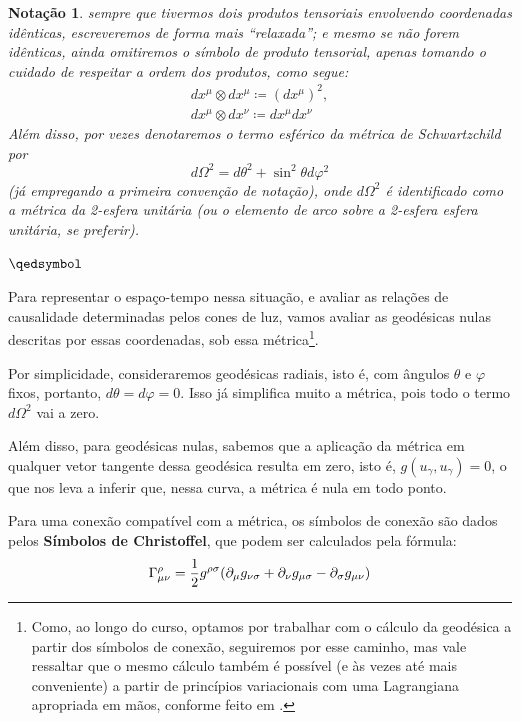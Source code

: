 \documentclass[12pt, a4paper]{article}
\theoremstyle{meuremarkstyle}
\newtheorem*{notação}{Notação}
\theoremstyle{definicao}
\begin{document}
\begin{notação}
sempre que tivermos dois produtos tensoriais envolvendo coordenadas idênticas, escreveremos de forma mais
\enquote{relaxada}; e mesmo se não forem idênticas, ainda omitiremos o símbolo de produto tensorial, apenas tomando o cuidado de
respeitar a ordem dos produtos, como segue:
\begin{gather*}
  dx^{\mu} \otimes dx^{\mu} \coloneq (dx^{\mu})^2,\\
  dx^{\mu} \otimes dx^{\nu}  \coloneq dx^{\mu}dx^{\nu}
\end{gather*} 
Além disso, por vezes denotaremos o termo esférico da métrica de Schwartzchild por
\begin{equation*}
  d\Omega^2 = d\theta ^2 + \sin^2\theta d\varphi ^2
\end{equation*}
(já empregando a primeira convenção de notação), onde $d\Omega^2$ é identificado como a 
métrica da 2-esfera unitária (ou o elemento de arco sobre a 2-esfera esfera unitária, se preferir).
\begin{flushright}
 $\qedsymbol$
\end{flushright}
\end{notação}

Para representar o espaço-tempo nessa situação, e avaliar as relações de causalidade
determinadas pelos cones de luz, vamos avaliar as geodésicas nulas descritas por
essas coordenadas, sob essa métrica\footnote{Como, ao longo do curso, optamos por trabalhar
com o cálculo da geodésica a partir dos símbolos de conexão, seguiremos por esse caminho, mas
vale ressaltar que o mesmo cálculo também é possível (e às vezes até mais conveniente) a 
partir de princípios variacionais com uma Lagrangiana apropriada em mãos, conforme feito em
\cite{schuller2015}.}. 

Por simplicidade, consideraremos geodésicas radiais, isto é, com
ângulos $\theta$ e $\varphi$ fixos, portanto, $d\theta = d\varphi = 0$. Isso
já simplifica muito a métrica, pois todo o termo $d\Omega^2$ vai a zero.

Além disso, para geodésicas nulas, sabemos que a aplicação da métrica em qualquer vetor tangente dessa 
geodésica resulta em zero, isto é, $g(u_\gamma,u_\gamma) = 0$, o que nos leva a inferir que,
nessa curva, a métrica é nula em todo ponto. 

Para uma conexão compatível com a métrica, os símbolos de conexão são dados pelos \textbf{Símbolos de
Christoffel}, que podem ser calculados pela fórmula:
\begin{equation*}
  \Gamma^\rho_{\mu\nu} = \frac{1}{2}g^{\rho \sigma}\qty(\partial_\mu g_{\nu\sigma} + \partial_{\nu}g_{\mu\sigma} - \partial_{\sigma}g_{\mu\nu})
\end{equation*}
\end{document}
